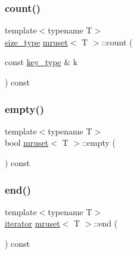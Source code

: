 \mbox{\label{classmruset_aff65b732aed809fb84542e1136321a24}} 
\subsubsection{\texorpdfstring{count()}{count()}}
{\footnotesize\ttfamily template$<$typename T$>$ \\
\mbox{\hyperlink{classmruset_aaee46af18d8a5bdc503e9570e499a335}{size\+\_\+type}} \mbox{\hyperlink{classmruset}{mruset}}$<$ T $>$\+::count (\begin{DoxyParamCaption}\item[{const \mbox{\hyperlink{classmruset_a282941ee7f0438b0c09274b10c78cda0}{key\+\_\+type}} \&}]{k }\end{DoxyParamCaption}) const\hspace{0.3cm}{\ttfamily [inline]}}

\mbox{\label{classmruset_a94f290b3990c91c3606ab11935cee849}} 
\subsubsection{\texorpdfstring{empty()}{empty()}}
{\footnotesize\ttfamily template$<$typename T$>$ \\
bool \mbox{\hyperlink{classmruset}{mruset}}$<$ T $>$\+::empty (\begin{DoxyParamCaption}{ }\end{DoxyParamCaption}) const\hspace{0.3cm}{\ttfamily [inline]}}

\mbox{\label{classmruset_ac93f008bbc701f8c9512f6f1d8ae1d24}} 
\subsubsection{\texorpdfstring{end()}{end()}}
{\footnotesize\ttfamily template$<$typename T$>$ \\
\mbox{\hyperlink{classmruset_a246172eda1afff45be47a013c14b1ad6}{iterator}} \mbox{\hyperlink{classmruset}{mruset}}$<$ T $>$\+::end (\begin{DoxyParamCaption}{ }\end{DoxyParamCaption}) const\hspace{0.3cm}{\ttfamily [inline]}}


